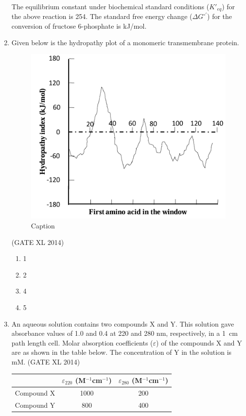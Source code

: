 \documentclass[journal,12pt,onecolumn]{IEEEtran}
\theoremstyle{remark}
\begin{document}
\begin{enumerate}
    The equilibrium constant under biochemical standard conditions ($K'_{eq}$) for the above reaction is 254.  
    The standard free energy change ($\Delta G^{\circ'}$) for the conversion of fructose 6-phosphate is \underline{\hspace{2cm}} kJ/mol.

  \item Given below is the hydropathy plot of a monomeric transmembrane protein.
\begin{figure}[H]
    \centering
    \includegraphics[width=0.5\columnwidth]{fig24.png}
    \caption{Caption}
    \label{fig:placeholder}
\end{figure}
\hfill (GATE XL 2014)\\
\begin{multicols}{2}
  \begin{enumerate}
    \item 1
    \item 2
    \item 4
    \item 5
  \end{enumerate}
  \end{multicols}

  \item An aqueous solution contains two compounds X and Y. This solution gave absorbance values of 1.0 and 0.4 at 220 and 280 nm, respectively, in a 1~cm path length cell. Molar absorption coefficients ($\varepsilon$) of the compounds X and Y are as shown in the table below. The concentration of Y in the solution is \underline{\hspace{2cm}} mM.
  \hfill (GATE XL 2014)\\

\begin{center}
\begin{tabular}{c|cc}
{} & $\varepsilon_{220}$ (M$^{-1}$cm$^{-1}$) & $\varepsilon_{280}$ (M$^{-1}$cm$^{-1}$) \\
\hline
Compound X & 1000 & 200 \\
Compound Y & 800 & 400
\end{tabular}
\end{center}
\vspace{0.5cm}


\end{enumerate}
\end{document}
